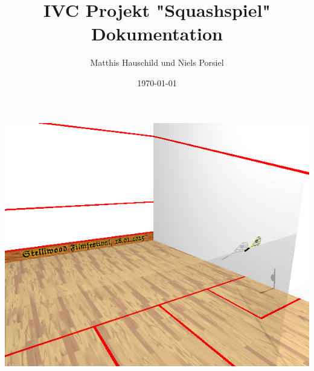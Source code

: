 \documentclass[12pt,a4paper,oneside,ngerman]{scrartcl}
\title{IVC Projekt "Squashspiel" Dokumentation}
\author{Matthis Hauschild und Niels Porsiel}
\date{\today}
\begin{document}
	\maketitle
	\includegraphics[width=\linewidth]{images/titleimage.png}
	\vspace{\fill}
	
\end{document}
